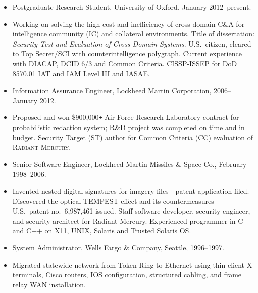 \documentclass[12pt,letterpaper]{article}
\newenvironment{myquote}{\list{}{\leftmargin=0.25in\rightmargin=0in}\item[]}{\endlist}
\begin{document}
\vspace{-2mm}
\begin{itemize}
	\item Postgraduate Research Student, University of Oxford, January 2012--present.
		\vspace{-2mm}
		\begin{myquote}
			Working on solving the high cost and inefficiency of cross domain
			C\&A for intelligence community (IC) and collateral environments.  Title of dissertation:
			\emph{Security Test and Evaluation of Cross Domain Systems}.
			U.S.\ citizen, cleared to Top Secret/SCI with counterintelligence polygraph.
			Current experience with DIACAP, DCID 6/3 and Common Criteria.
			CISSP-ISSEP for DoD 8570.01 IAT and IAM Level III and IASAE.
		\end{myquote}

\vspace{-2.5mm}
	\item Information Assurance Engineer, Lockheed Martin Corporation, 2006--January 2012.
		\vspace{-2mm}
		\begin{myquote}
			Proposed and won \$900,000\texttt{+} Air Force Research Laboratory contract
			for probabilistic redaction system; R\&D project was completed on time
			and in budget.  Security Target (ST) author for Common Criteria (CC)
			evaluation of \textsc{Radiant Mercury}.
		\end{myquote}

\vspace{-2.5mm}
	\item Senior Software Engineer, Lockheed Martin Missiles \& Space Co., February 1998--2006.
		\vspace{-2mm}
		\begin{myquote}
			Invented nested digital signatures for imagery files---patent application filed.
			Discovered the optical TEMPEST effect and its
			countermeasures---U.S.\ patent no.\ 6,987,461 issued.  Staff software developer,
			security engineer, and security architect for
			Radiant Mercury.  Experienced programmer in C and C++ on X11, UNIX, Solaris and
			Trusted Solaris OS.
		\end{myquote}
	
\vspace{-2.5mm}
	\item System Administrator, Wells Fargo \& Company, Seattle, 1996--1997.
		\vspace{-2mm}
		\begin{myquote}
			Migrated statewide network from Token Ring to Ethernet using thin client X
			terminals, Cisco routers, IOS configuration, structured cabling, and frame relay
			WAN installation.
		\end{myquote}


\end{itemize}
\end{document}
